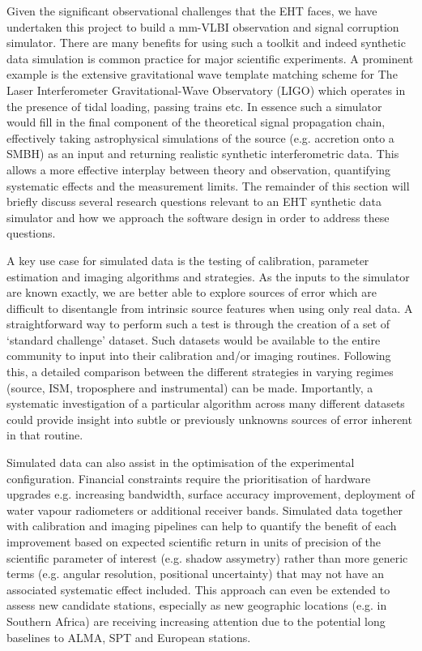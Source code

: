 Given the significant observational challenges that the EHT faces, we have undertaken this project to build a mm-VLBI observation and signal corruption simulator. There are many benefits for using such a toolkit and indeed synthetic data simulation is common practice for major scientific experiments. A prominent example is the extensive gravitational wave template matching scheme for The Laser Interferometer Gravitational-Wave Observatory (LIGO) which operates in the presence of tidal loading, passing trains etc. In essence such a simulator would fill in the final component of the theoretical signal propagation chain, effectively taking astrophysical simulations of the source (e.g. accretion onto a SMBH) as an input and returning realistic synthetic interferometric data. This allows a more effective interplay between theory and observation, quantifying systematic effects and the measurement limits. The remainder of this section will briefly discuss several research questions relevant to an EHT synthetic data simulator and how we approach the software design in order to address these questions. 


A key use case for simulated data is the testing of calibration, parameter estimation and imaging algorithms and strategies. As the inputs to the simulator are known exactly, we are better able to explore sources of error which are difficult to disentangle from intrinsic source features when using only real data. A straightforward way to perform such a test is through the creation of a set of `standard challenge' dataset. Such datasets would be available to the entire community to input into their calibration and/or imaging routines. Following this, a detailed comparison between the different strategies in varying regimes (source, ISM, troposphere and instrumental) can be made. Importantly, a systematic investigation of a particular algorithm across many different datasets could provide insight into subtle or previously unknowns sources of error inherent in that routine.


Simulated data can also assist in the optimisation of the experimental configuration. Financial constraints require the prioritisation of hardware upgrades e.g. increasing bandwidth, surface accuracy improvement, deployment of water vapour radiometers or additional receiver bands. Simulated data together with calibration and imaging pipelines can help to quantify the benefit of each improvement based on expected scientific return in units of precision of the scientific parameter of interest (e.g. shadow assymetry) rather than more generic terms (e.g. angular resolution, positional uncertainty) that may not have an associated systematic effect included. This approach can even be extended to assess new candidate stations, especially as new geographic locations (e.g. in Southern Africa) are receiving increasing attention due to the potential long baselines to ALMA, SPT and European stations.


